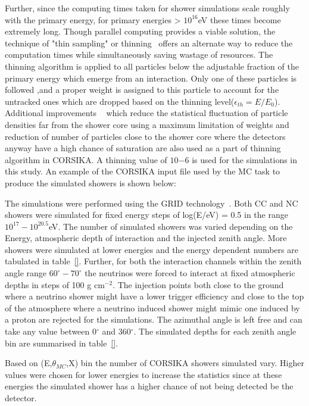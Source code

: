 Further, since the computing times taken for shower simulations scale roughly with the primary energy, for primary energies > $10^{16}$eV these times become extremely long. Though parallel computing provides a viable solution, the technique of "thin sampling" or thinning~\cite{} offers an alternate way to reduce the computation times while simultaneously saving wastage of resources. The thinning algorithm is applied to all particles below the adjustable fraction of the primary energy which emerge from an interaction. Only one of these particles is followed ,and a proper weight is assigned to this particle to account for the untracked ones which are dropped based on the thinning level($\epsilon_{th} = E/E_0$). Additional improvements ~\cite{} which reduce the statistical fluctuation of particle densities far from the shower core using a maximum limitation of weights and reduction of number of particles close to the shower core where the detectors anyway have a high chance of saturation are also used as a part of thinning algorithm in CORSIKA. A thinning value of $10{-6}$ is used for the simulations in this study. An example of the CORSIKA input file used by the MC task to produce the simulated showers is shown below:


The simulations were performed using the GRID technology~\cite{}. Both CC and NC showers were simulated for fixed energy steps of log(E/eV) = 0.5 in the range $10^{17}-10^{20.5}$eV. The number of simulated showers was varied depending on the Energy, atmospheric depth of interaction and the injected zenith angle. More showers were simulated at lower energies and the energy dependent numbers are tabulated in table~\ref{}. Further, for both the interaction channels within the zenith angle range $60^{\circ}-70^{\circ}$ the neutrinos were forced to interact at fixed atmospheric depths in steps of 100 g cm$^{-2}$. The injection points both close to the ground where a neutrino shower might have a lower trigger efficiency and close to the top of the atmosphere where a neutrino induced shower might mimic one induced by a proton are rejected for the simulations. The azimuthal angle is left free and can take any value between 0$^{\circ}$ and 360$^{\circ}$. The simulated depths for each zenith angle bin are summarised in table~\ref{}. 

Based on (E,$\theta_{MC}$,X) bin the number of CORSIKA showers simulated vary. Higher values were chosen for lower energies to increase the statistics since at these energies the simulated shower has a higher chance of not being detected be the detector.  

